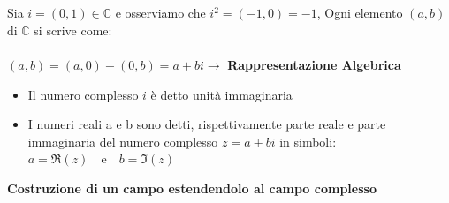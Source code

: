 \documentclass{report}
\begin{document}
\\ \\
Sia $i = (0,1) \in \mathbb{C}$ e osserviamo che $i^2 = (-1, 0) = -1$, Ogni elemento $(a,b)$ di $\mathbb{C}$ si scrive come:
\\ \\
$(a,b) = (a,0) + (0,b) = a + bi \rightarrow$ \textbf{Rappresentazione Algebrica}
\begin{itemize}
    \item{Il numero complesso $i$ è detto unità immaginaria}
    \item{I numeri reali a e b sono detti, rispettivamente parte reale e parte immaginaria del numero complesso $z= a + bi$ in simboli: $a = \Re(z) \quad \text{e} \quad b = \Im(z)$}
\end{itemize}
\textbf{Costruzione di un campo estendendolo al campo complesso}
\end{document}
